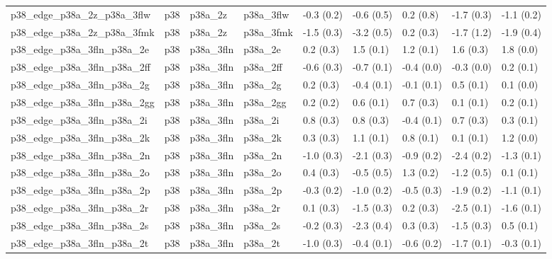 \begin{tabular}{lllllllll}
p38\_edge\_p38a\_2z\_p38a\_3flw       &       p38 &     p38a\_2z &   p38a\_3flw &  -0.3 (0.2) &        -0.6 (0.5) &   0.2 (0.8) &  -1.7 (0.3) &  -1.1 (0.2) \\
p38\_edge\_p38a\_2z\_p38a\_3fmk       &       p38 &     p38a\_2z &   p38a\_3fmk &  -1.5 (0.3) &        -3.2 (0.5) &   0.2 (0.3) &  -1.7 (1.2) &  -1.9 (0.4) \\
p38\_edge\_p38a\_3fln\_p38a\_2e       &       p38 &   p38a\_3fln &     p38a\_2e &   0.2 (0.3) &         1.5 (0.1) &   1.2 (0.1) &   1.6 (0.3) &   1.8 (0.0) \\
p38\_edge\_p38a\_3fln\_p38a\_2ff      &       p38 &   p38a\_3fln &    p38a\_2ff &  -0.6 (0.3) &        -0.7 (0.1) &  -0.4 (0.0) &  -0.3 (0.0) &   0.2 (0.1) \\
p38\_edge\_p38a\_3fln\_p38a\_2g       &       p38 &   p38a\_3fln &     p38a\_2g &   0.2 (0.3) &        -0.4 (0.1) &  -0.1 (0.1) &   0.5 (0.1) &   0.1 (0.0) \\
p38\_edge\_p38a\_3fln\_p38a\_2gg      &       p38 &   p38a\_3fln &    p38a\_2gg &   0.2 (0.2) &         0.6 (0.1) &   0.7 (0.3) &   0.1 (0.1) &   0.2 (0.1) \\
p38\_edge\_p38a\_3fln\_p38a\_2i       &       p38 &   p38a\_3fln &     p38a\_2i &   0.8 (0.3) &         0.8 (0.3) &  -0.4 (0.1) &   0.7 (0.3) &   0.3 (0.1) \\
p38\_edge\_p38a\_3fln\_p38a\_2k       &       p38 &   p38a\_3fln &     p38a\_2k &   0.3 (0.3) &         1.1 (0.1) &   0.8 (0.1) &   0.1 (0.1) &   1.2 (0.0) \\
p38\_edge\_p38a\_3fln\_p38a\_2n       &       p38 &   p38a\_3fln &     p38a\_2n &  -1.0 (0.3) &        -2.1 (0.3) &  -0.9 (0.2) &  -2.4 (0.2) &  -1.3 (0.1) \\
p38\_edge\_p38a\_3fln\_p38a\_2o       &       p38 &   p38a\_3fln &     p38a\_2o &   0.4 (0.3) &        -0.5 (0.5) &   1.3 (0.2) &  -1.2 (0.5) &   0.1 (0.1) \\
p38\_edge\_p38a\_3fln\_p38a\_2p       &       p38 &   p38a\_3fln &     p38a\_2p &  -0.3 (0.2) &        -1.0 (0.2) &  -0.5 (0.3) &  -1.9 (0.2) &  -1.1 (0.1) \\
p38\_edge\_p38a\_3fln\_p38a\_2r       &       p38 &   p38a\_3fln &     p38a\_2r &   0.1 (0.3) &        -1.5 (0.3) &   0.2 (0.3) &  -2.5 (0.1) &  -1.6 (0.1) \\
p38\_edge\_p38a\_3fln\_p38a\_2s       &       p38 &   p38a\_3fln &     p38a\_2s &  -0.2 (0.3) &        -2.3 (0.4) &   0.3 (0.3) &  -1.5 (0.3) &   0.5 (0.1) \\
p38\_edge\_p38a\_3fln\_p38a\_2t       &       p38 &   p38a\_3fln &     p38a\_2t &  -1.0 (0.3) &        -0.4 (0.1) &  -0.6 (0.2) &  -1.7 (0.1) &  -0.3 (0.1) \\

\end{tabular}
